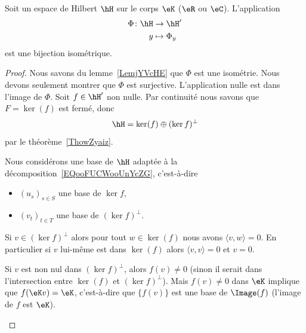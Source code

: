 \begin{theorem}        \label{ThoQgTovL}
	Soit un espace de Hilbert \( \hH\) sur le corps \( \eK\) (\( \eR\) ou \( \eC\)). L'application
	\begin{equation}
		\begin{aligned}
			\Phi\colon \hH & \to \hH'       \\
			y              & \mapsto \Phi_y
		\end{aligned}
	\end{equation}
	est une bijection isométrique.
\end{theorem}

\begin{proof}
	Nous savons du lemme~\ref{LemjYVcHE} que \(\Phi\) est une isométrie. Nous devons seulement montrer que \( \Phi\) est surjective. L'application nulle est dans l'image de \( \Phi\). Soit \( f\in \hH'\) non nulle. Par continuité nous savons que \( F=\ker(f)\) est fermé, donc
	\begin{equation}    \label{EQooFUCWooUnYcZG}
		\hH=\ker(f)\oplus(\ker f)^{\perp}
	\end{equation}
	par le théorème~\ref{ThowZyaiz}.

	\begin{subproof}

		Nous considérons une base de \( \hH\) adaptée à la décomposition~\ref{EQooFUCWooUnYcZG}, c'est-à-dire
		\begin{itemize}
			\item \( (u_s)_{s\in S}\) une base de \( \ker f\),
			\item
			      \( (v_t)_{t\in T}\) une base de \( (\ker f)^{\perp}\).
		\end{itemize}

		\spitem[\( (\ker f)^{\perp}\cap\ker(f)=\{ 0 \}  \)]

		Si \( v\in (\ker f)^{\perp}\) alors pour tout \( w\in \ker(f)\) nous avons \( \langle v, w\rangle =0\). En particulier si \( v\) lui-même est dans \( \ker(f)\) alors \( \langle v, v\rangle =0\) et \( v=0\).

		Si \( v\) est non nul dans \(  (\ker f)^{\perp}\), alors \( f(v)\neq 0\) (sinon il serait dans l'intersection entre \( \ker(f)\) et \( (\ker f)^{\perp}\)). Mais \( f(v)\neq 0\) dans \( \eK\) implique que \( f(\eK v)=\eK\), c'est-à-dire que \( \{ f(v) \}\) est une base de \( \Image(f)\) (l'image de \( f\) est \( \eK\)).


\end{subproof}
\end{proof}
